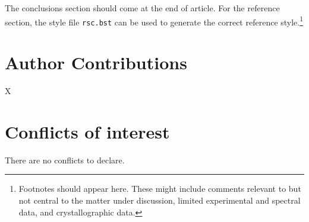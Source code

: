 \documentclass[twoside,twocolumn,9pt]{article}
\renewcommand{\refname}{Notes and references}
\begin{document}



\clearpage
The conclusions section should come at the end of article. For the reference section, the style file \texttt{rsc.bst} can be used to generate the correct reference style.\footnote[4]{Footnotes should appear here. These might include comments relevant to but not central to the matter under discussion, limited experimental and spectral data, and crystallographic data.}

\section*{Author Contributions}
X

\section*{Conflicts of interest}
There are no conflicts to declare.








\scriptsize{
 } %
\end{document}
